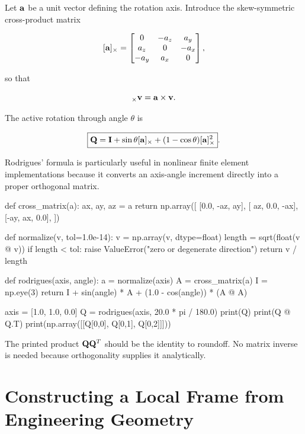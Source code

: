 Let $\mathbf{a}$ be a unit vector defining the rotation axis. Introduce the
skew-symmetric cross-product matrix

\begin{equation}\label{eq:coord-skew}
    [\mathbf{a}]_{\times}
    =
    \begin{bmatrix}
        0&-a_z&a_y\\
        a_z&0&-a_x\\
        -a_y&a_x&0
    \end{bmatrix},
\end{equation}

so that

\begin{equation}
    [\m{a}]_{\times}\m{v}=\m{a}\times\m{v}.
\end{equation}

The active rotation through angle $\theta$ is

\begin{equation}\label{eq:coord-rodrigues}
    \boxed{
    \mathbf{Q}
    =\mathbf{I}
    +\sin\theta[\mathbf{a}]_{\times}
    +(1-\cos\theta)[\mathbf{a}]_{\times}^{2}
    }.
\end{equation}

Rodrigues' formula is particularly useful in nonlinear finite element
implementations because it converts an axis-angle increment directly into a
proper orthogonal matrix.

\begin{python}
def cross_matrix(a):
    ax, ay, az = a
    return np.array([
        [0.0, -az,  ay],
        [ az, 0.0, -ax],
        [-ay,  ax, 0.0],
    ])


def normalize(v, tol=1.0e-14):
    v = np.array(v, dtype=float)
    length = sqrt(float(v @ v))
    if length < tol:
        raise ValueError("zero or degenerate direction")
    return v / length


def rodrigues(axis, angle):
    a = normalize(axis)
    A = cross_matrix(a)
    I = np.eye(3)
    return I + sin(angle) * A + (1.0 - cos(angle)) * (A @ A)


axis = [1.0, 1.0, 0.0]
Q = rodrigues(axis, 20.0 * pi / 180.0)
print(Q)
print(Q @ Q.T)
print(np.array([[Q[0,0], Q[0,1], Q[0,2]]]))
\end{python}

The printed product $\mathbf{Q}\mathbf{Q}^{T}$ should be the identity to roundoff.
No matrix inverse is needed because orthogonality supplies it analytically.

\section[Local Frames from Engineering Geometry]{Constructing a Local Frame from Engineering Geometry}

